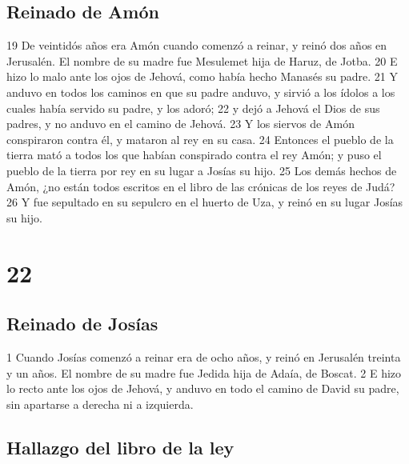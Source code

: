 \section*{Reinado de Amón}

 
19 De veintidós años era Amón cuando comenzó a reinar, y reinó dos años en Jerusalén. El nombre de su madre fue Mesulemet hija de Haruz, de Jotba.
20 E hizo lo malo ante los ojos de Jehová, como había hecho Manasés su padre.
21 Y anduvo en todos los caminos en que su padre anduvo, y sirvió a los ídolos a los cuales había servido su padre, y los adoró;
22 y dejó a Jehová el Dios de sus padres, y no anduvo en el camino de Jehová.
23 Y los siervos de Amón conspiraron contra él, y mataron al rey en su casa.
24 Entonces el pueblo de la tierra mató a todos los que habían conspirado contra el rey Amón; y puso el pueblo de la tierra por rey en su lugar a Josías su hijo.
25 Los demás hechos de Amón, ¿no están todos escritos en el libro de las crónicas de los reyes de Judá?
26 Y fue sepultado en su sepulcro en el huerto de Uza, y reinó en su lugar Josías su hijo.

\chapter{22}

\section*{Reinado de Josías}

 

1 Cuando Josías comenzó a reinar era de ocho años, y reinó en Jerusalén treinta y un años. El nombre de su madre fue Jedida hija de Adaía, de Boscat.
2 E hizo lo recto ante los ojos de Jehová, y anduvo en todo el camino de David su padre, sin apartarse a derecha ni a izquierda.
\section*{Hallazgo del libro de la ley}

